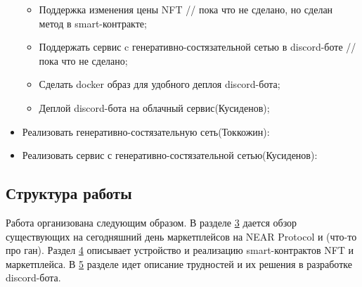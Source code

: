 \begin{itemize}
\begin{itemize}
        \item Поддержка изменения цены NFT // пока что не сделано, но сделан метод в smart-контракте;
        \item Поддержать сервис c генеративно-состязательной сетью в discord-боте // пока что не сделано;
        \item Сделать docker образ для удобного деплоя discord-бота;
        \item Деплой discord-бота на облачный сервис(Кусиденов);
    \end{itemize}
    \item Реализовать генеративно-состязательную сеть(Токкожин):
    \item Реализовать сервис с генеративно-состязательной сетью(Кусиденов):
\end{itemize}

\subsection{Структура работы}

Работа организована следующим образом. В разделе \hyperref[section.3]{\color{blue} 3} дается обзор существующих на сегодняшний день маркетплейсов на NEAR Protocol и (что-то про ган). Раздел \hyperref[section.4]{\color{blue} 4} описывает устройство и реализацию smart-контрактов NFT и маркетплейса. В \hyperref[section.5]{\color{blue} 5} разделе идет описание трудностей и их решения в разработке discord-бота.

